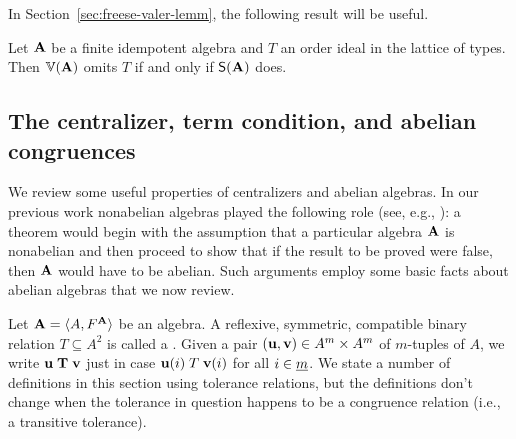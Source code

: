 In Section~\ref{sec:freese-valer-lemm}, the following result will be useful.
\begin{cor}
  \label{cor:2.2}
  Let $\mathbf{A}$ be a finite idempotent algebra and $T$ an order ideal in the
  lattice of types. Then $\operatorname{\mathbb{V}}(\mathbf{A})$ omits $T$ if and only if $\mathsf{S}(\mathbf{A})$ does.
\end{cor}



\draftsecskip

\subsection{The centralizer, term condition, and abelian congruences}
We review some useful properties of centralizers and abelian
algebras. In our previous work 
nonabelian algebras played the following role
(see, e.g., \cite{Bergman-DeMeo}):
a theorem would begin with the assumption that a particular algebra $\mathbf{A}$ is
nonabelian and then proceed to show that if the result to be proved were false,
then $\mathbf{A}$ would have to be abelian.
Such arguments employ some basic facts about abelian algebras that we now review.

\label{sec:definitions}
Let $\mathbf{A} = \langle A, F^{\mathbf{A}}\rangle$ be an algebra.
A reflexive, symmetric, compatible binary relation $T\subseteq A^2$ is called a
.  
Given a pair $(\mathbf{u}, \mathbf{v}) \in A^m\times A^m$ of $m$-tuples of $A$, we write 
$\mathbf{u} \mathrel{\mathbf{T}} \mathbf{v}$ just in case $\mathbf{u}(i) \mathrel{T} \mathbf{v}(i)$ for all $i\in \underline{m}$. 
We state a number of definitions in this section using tolerance relations, but 
the definitions don't change when the tolerance in question happens to be
a congruence relation (i.e., a transitive tolerance).


